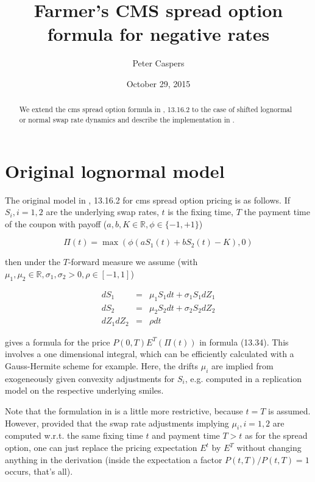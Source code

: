\documentclass{amsart}
\theoremstyle{plain}
\numberwithin{equation}{section}
\begin{document}
\title[Farmer's CMS spread option formula for negative rates]{Farmer's CMS spread option formula for negative rates}
\author{Peter Caspers}
\date{October 29, 2015}
\begin{abstract}
We extend the cms spread option formula in \cite{brigo}, 13.16.2 to the case of shifted lognormal or normal swap rate dynamics and describe the implementation in \cite{ql}.
\end{abstract}

\maketitle

\tableofcontents

\section{Original lognormal model}

The original model in \cite{brigo}, 13.16.2 for cms spread option pricing is as follows. If $S_i, i=1,2$ are the underlying swap rates, $t$ is the fixing time, $T$ the payment time of the coupon with payoff ($a,b,K \in \mathbb{R}, \phi\in\{-1,+1\}$)

\begin{equation}
\Pi(t) = \max( \phi (a S_1(t) + b S_2(t) - K), 0 )
\end{equation}

then under the $T$-forward measure we assume (with $\mu_1, \mu_2 \in \mathbb{R}, \sigma_1, \sigma_2 > 0, \rho \in [-1,1]$)

\begin{eqnarray}\label{origmodel}
dS_1 &=& \mu_1 S_1 dt + \sigma_1 S_1 dZ_1 \\
dS_2 &=& \mu_2 S_2 dt + \sigma_2 S_2 dZ_2 \\
dZ_1 dZ_2 &=& \rho dt
\end{eqnarray}

\cite{brigo} gives a formula for the price $P(0,T) E^T ( \Pi(t) )$ in formula (13.34). This involves a one dimensional integral, which can be efficiently calculated with a Gauss-Hermite scheme for example. Here, the drifts $\mu_i$ are implied from exogeneously given convexity adjustments for $S_i$, e.g. computed in a replication model on the respective underlying smiles.

Note that the formulation in \cite{brigo} is a little more restrictive, because $t=T$ is assumed. However, provided that the swap rate adjustments implying $\mu_i, i=1,2$ are computed w.r.t. the same fixing time $t$ and payment time $T>t$ as for the spread option, one can just replace the pricing expectation $E^t$ by $E^T$ without changing anything in the derivation (inside the expectation a factor $P(t,T) / P(t,T) = 1$ occurs, that's all).
\end{document}
